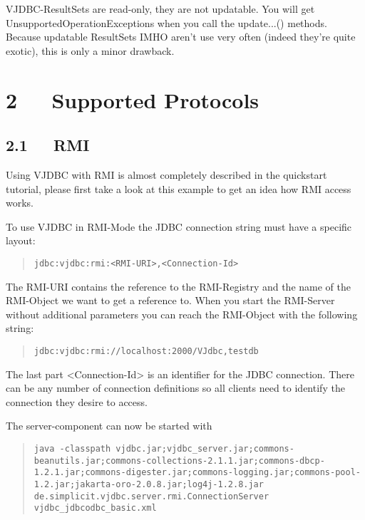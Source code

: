 \documentclass[10pt,a4paper,english]{article}
\begin{document}
VJDBC-ResultSets are read-only, they are not updatable. You will get UnsupportedOperationExceptions when you call the update...() methods. Because updatable ResultSets IMHO aren't use very often (indeed they're quite exotic), this is only a minor drawback.



\hypertarget{supported-protocols}{}
\section*{2~~~Supported Protocols}



\hypertarget{rmi}{}
\subsection*{2.1~~~RMI}

Using VJDBC with RMI is almost completely described in the quickstart tutorial, please first take a look at this example to get an idea how RMI access works.

To use VJDBC in RMI-Mode the JDBC connection string must have a specific layout:
\begin{quote}

\texttt{jdbc:vjdbc:rmi:<RMI-URI>,<Connection-Id>}
\end{quote}

The RMI-URI contains the reference to the RMI-Registry and the name of the RMI-Object we want to get a reference to. When you start the RMI-Server without additional parameters you can reach the RMI-Object with the following string:
\begin{quote}

\texttt{jdbc:vjdbc:rmi://localhost:2000/VJdbc,testdb}
\end{quote}

The last part {\textless}Connection-Id{\textgreater} is an identifier for the JDBC connection. There can be any number of connection definitions so all clients need to identify the connection they desire to access.

The server-component can now be started with
\begin{quote}

\texttt{java -classpath vjdbc.jar;vjdbc{\_}server.jar;commons-beanutils.jar;commons-collections-2.1.1.jar;commons-dbcp-1.2.1.jar;commons-digester.jar;commons-logging.jar;commons-pool-1.2.jar;jakarta-oro-2.0.8.jar;log4j-1.2.8.jar de.simplicit.vjdbc.server.rmi.ConnectionServer vjdbc{\_}jdbcodbc{\_}basic.xml}
\end{quote}
\end{document}
